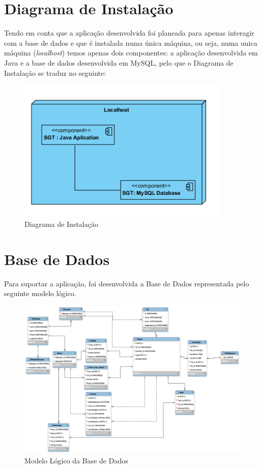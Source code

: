 \documentclass[12pt,a4paper]{report}
\begin{document}
\chapter{Diagrama de Instalação}
Tendo em conta que a aplicação desenvolvida foi planeada para apenas interagir com a base de dados e que é instalada numa única máquina, ou seja, numa unica máquina (\textit{localhost}) temos apenas dois componentes: a aplicação desenvolvida em Java e a base de dados desenvolvida em MySQL, pelo que o Diagrama de Instalação se traduz no seguinte:
\begin{figure}[H]
	\centering 
	\includegraphics[width=0.9\textwidth]{modelacao/diag_instalacao.png}  
	\caption{Diagrama de Instalação}
\end{figure}

\chapter{Base de Dados}
Para suportar a aplicação, foi desenvolvida a Base de Dados representada pelo seguinte modelo lógico.
\begin{figure}[H]
    \centering
    \includegraphics[width=\textwidth]{ModeloLogicoBD.png}
    \caption{Modelo Lógico da Base de Dados}
    \label{fig:modeloLogicoBD}
\end{figure}
\end{document}
